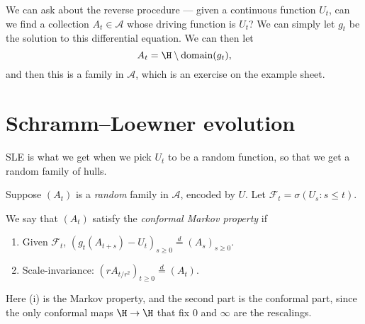 \documentclass[a4paper]{article}
\begin{document}
We can ask about the reverse procedure --- given a continuous function $U_t$, can we find a collection $A_t \in \mathcal{A}$ whose driving function is $U_t$? We can simply let $g_t$ be the solution to this differential equation. We can then let
\[
  A_t = \H \setminus \mathrm{domain}(g_t),
\]
and then this is a family in $\mathcal{A}$, which is an exercise on the example sheet.

\section{Schramm--Loewner evolution}
SLE is what we get when we pick $U_t$ to be a random function, so that we get a random family of hulls.

Suppose $(A_t)$ is a \emph{random} family in $\mathcal{A}$, encoded by $U$. Let $\mathcal{F}_t = \sigma(U_s: s \leq t)$.
\begin{defi}
  We say that $(A_t)$ satisfy the \emph{conformal Markov property} if
  \begin{enumerate}
    \item Given $\mathcal{F}_t$, $(g_t(A_{t + s}) - U_t)_{s \geq 0} \overset{d}{=} (A_s)_{s \geq 0}$.
    \item Scale-invariance: $(r A_{t/r^2} )_{t \geq 0} \overset{d}{=} (A_t)$.
  \end{enumerate}
\end{defi}
Here (i) is the Markov property, and the second part is the conformal part, since the only conformal maps $\H \to \H$ that fix $0$ and $\infty$ are the rescalings.
\printindex
\end{document}
